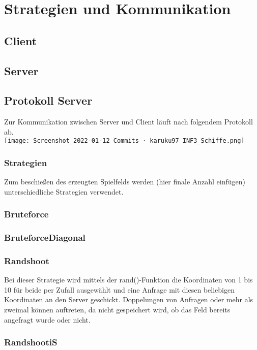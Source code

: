 \section*{Strategien und Kommunikation}

\subsection*{Client}




\subsection*{Server}

\subsection*{Protokoll Server}
Zur Kommunikation zwischen Server und Client läuft nach folgendem Protokoll ab.\\
\texttt{[image: Screenshot\_2022-01-12 Commits · karuku97 INF3\_Schiffe.png]}
\\
\subsubsection*{Strategien}
Zum beschießen des erzeugten Spielfelds werden (hier finale Anzahl einfügen) unterschiedliche Strategien verwendet.

\subsubsection*{Bruteforce}

\subsubsection*{BruteforceDiagonal}

\subsubsection*{Randshoot}

Bei dieser Strategie wird mittels der rand()-Funktion die Koordinaten von 1 bis 10 für
beide per Zufall ausgewählt und eine Anfrage mit diesen beliebigen Koordinaten an den
Server geschickt. Doppelungen von Anfragen oder mehr als zweimal können auftreten,
da nicht gespeichert wird, ob das Feld bereits angefragt wurde oder nicht.

\subsubsection*{RandshootiS}

